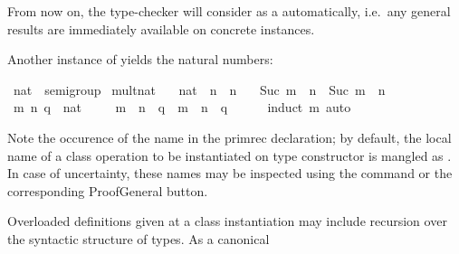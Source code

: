 \begin{isabellebody}
\begin{isamarkuptext}
  From now on, the type-checker will consider  as a  automatically, i.e.\ any general results are immediately
  available on concrete instances.

  \medskip Another instance of  yields the natural
  numbers:%
\end{isamarkuptext}%
\isamarkuptrue%
%
\isadelimquote
%
\endisadelimquote
%
\isatagquote
{}\isamarkupfalse%
\ nat\ {\isacharcolon}{\isacharcolon}\ semigroup\isanewline
{}\isanewline
\isanewline
{}\isamarkupfalse%
\ mult{\isacharunderscore}nat\ \isanewline
\ \ {\isachardoublequoteopen}{\isacharparenleft}{}{\isasymColon}nat{\isacharparenright}\ {\isasymotimes}\ n\ {\isacharequal}\ n{\isachardoublequoteclose}\isanewline
\ \ {\isacharbar}\ {\isachardoublequoteopen}Suc\ m\ {\isasymotimes}\ n\ {\isacharequal}\ Suc\ {\isacharparenleft}m\ {\isasymotimes}\ n{\isacharparenright}{\isachardoublequoteclose}\isanewline
\isanewline
{}\isamarkupfalse%
\ \isamarkupfalse%
\isanewline
\ \ \isamarkupfalse%
\ m\ n\ q\ {\isacharcolon}{\isacharcolon}\ nat\ \isanewline
\ \ \isamarkupfalse%
\ {\isachardoublequoteopen}m\ {\isasymotimes}\ n\ {\isasymotimes}\ q\ {\isacharequal}\ m\ {\isasymotimes}\ {\isacharparenleft}n\ {\isasymotimes}\ q{\isacharparenright}{\isachardoublequoteclose}\isanewline
\ \ \ \ \isamarkupfalse%
\ {\isacharparenleft}induct\ m{\isacharparenright}\ auto\isanewline
{}\isamarkupfalse%
\isanewline
\isanewline
{}\isamarkupfalse%
%
\endisatagquote
{\isafoldquote}%
%
\isadelimquote
%
\endisadelimquote
%
\begin{isamarkuptext}%
\noindent Note the occurence of the name  in the
  primrec declaration; by default, the local name of a class operation
   to be instantiated on type constructor \isa{{\isasymkappa}} is
  mangled as .  In case of uncertainty, these names may be
  inspected using the \hyperlink{command.print-context}{\mbox{}} command or the
  corresponding ProofGeneral button.%
\end{isamarkuptext}%
\isamarkuptrue%
%
\isamarkuptrue%
%
\begin{isamarkuptext}%
Overloaded definitions given at a class instantiation may include
  recursion over the syntactic structure of types.  As a canonical

\end{isamarkuptext}
\end{isabellebody}
